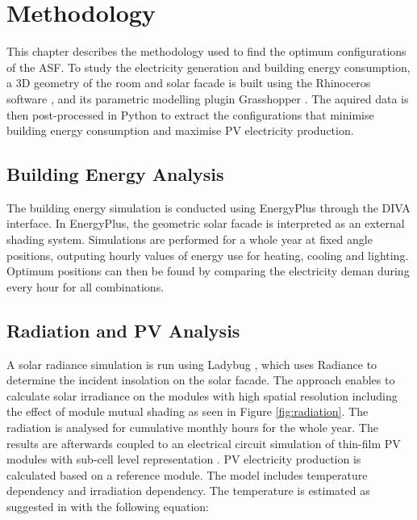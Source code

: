 \chapter{Methodology}
\label{c:methodology}

	This chapter describes the methodology used to find the optimum configurations of the ASF. To study the electricity generation and building energy consumption, a 3D geometry of the room and solar facade is built using the Rhinoceros software \cite{Rhino}, and its parametric modelling plugin Grasshopper \cite{grasshopper}. The aquired data is then post-processed in Python \cite{python} to extract the configurations that minimise building energy consumption and maximise PV electricity production.

	\section{Building Energy Analysis}

		The building energy simulation is conducted using EnergyPlus \cite{energyplus} through the DIVA \cite{DIVA} interface. In EnergyPlus, the geometric solar facade is interpreted as an external shading system. Simulations are performed for a whole year at fixed angle positions, outputing hourly values of energy use for heating, cooling and lighting. Optimum positions can then be found by comparing the electricity deman during every hour for all combinations. 

	\section{Radiation and PV Analysis}

		A solar radiance simulation is run using Ladybug \cite{roudsari2014ladybug},  which uses Radiance \cite{ward1994radiance} to determine the incident insolation on the solar facade. The approach enables to calculate solar irradiance on the modules with high spatial resolution including the effect of module mutual shading as seen in Figure \ref{fig:radiation}. The radiation is analysed for cumulative monthly hours for the whole year. The results are afterwards coupled to an electrical circuit simulation of thin-film PV modules with sub-cell level representation \cite{hofer2015PVSEC}. PV electricity production is calculated based on a reference module. The model includes temperature dependency and irradiation dependency. The temperature is estimated as suggested in \cite{Ross_Smokler_1986} with the following equation:

